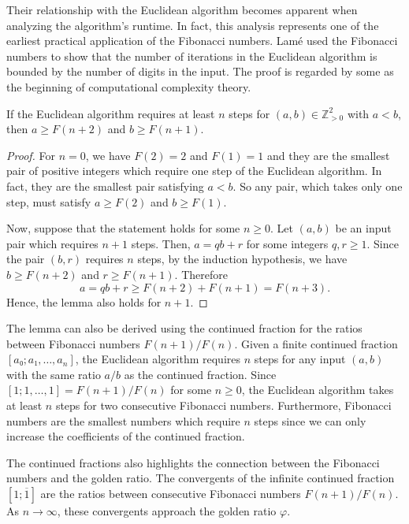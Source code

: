 Their relationship with the Euclidean algorithm becomes apparent when analyzing
the algorithm's runtime.
In fact, this analysis represents one of the earliest practical application of
the Fibonacci numbers.
Lamé \cite{Lame44} used the Fibonacci numbers to show that the number of
iterations in the Euclidean algorithm is bounded by the number of digits in the
input.
The proof is regarded by some as the beginning of computational
complexity theory.

\begin{lemma}
  \label{thm:lame}
  If the Euclidean algorithm requires at least $n$ steps for $(a, b) ∈ ℤ_{> 0}^2$ with $a < b$,
  then $a ≥ F(n+2)$ and $b ≥ F(n+1)$.
\end{lemma}

\begin{proof}
  For $n = 0$, we have $F(2) = 2$ and $F(1) = 1$
  and they are the smallest pair of positive integers which require one step of
  the Euclidean algorithm.
  In fact, they are the smallest pair satisfying $a < b$.
  So any pair, which takes only one step, must satisfy $a ≥ F(2)$ and $b ≥ F(1)$.

  Now, suppose that the statement holds for some $n ≥ 0$.
  Let $(a, b)$ be an input pair which requires $n+1$ steps.
  Then, $a = qb + r$ for some integers $q, r ≥ 1$.
  Since the pair $(b, r)$ requires $n$ steps, by the induction hypothesis,
  we have $b ≥ F(n+2)$ and $r ≥ F(n+1)$.
  Therefore
  \[
    a = qb + r ≥ F(n+2) + F(n+1) = F(n+3).
  \]
  Hence, the lemma also holds for $n+1$.
\end{proof}

The lemma can also be derived using the continued fraction for the ratios
between Fibonacci numbers $F(n+1)/F(n)$.
Given a finite continued fraction $[a₀; a₁, …, a_n]$, the Euclidean algorithm
requires $n$ steps for any input $(a, b)$ with the same ratio $a/b$ as the
continued fraction.
Since $[1; 1, …, 1] = F(n+1)/F(n)$ for some $n ≥ 0$, the Euclidean algorithm
takes at least $n$ steps for two consecutive Fibonacci numbers.
Furthermore, Fibonacci numbers are the smallest numbers which require $n$ steps
since we can only increase the coefficients of the continued fraction.

The continued fractions also highlights the connection between the Fibonacci
numbers and the golden ratio.
The convergents of the infinite continued fraction $[1; \overline{1}]$ are the ratios
between consecutive Fibonacci numbers $F(n+1)/F(n)$.
As $n → ∞$, these convergents approach the golden ratio $φ$.

